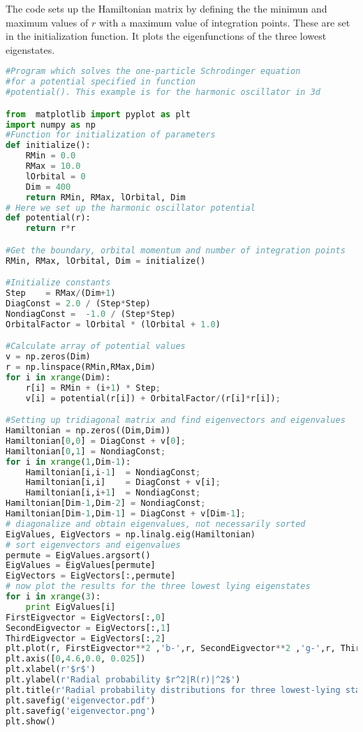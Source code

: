 \documentclass[graybox,sectrefs,envcountresetchap,open=right]{svmonodo}
\begin{document}
\noindent
The code sets up the Hamiltonian matrix by defining the the minimun and maximum values of $r$ with a
maximum value of integration points.  These are set in the initialization function. It plots the 
eigenfunctions of the three lowest eigenstates.
\begin{lstlisting}[language=Python,style=blue1bar]
#Program which solves the one-particle Schrodinger equation 
#for a potential specified in function
#potential(). This example is for the harmonic oscillator in 3d

from  matplotlib import pyplot as plt
import numpy as np
#Function for initialization of parameters
def initialize():
    RMin = 0.0
    RMax = 10.0
    lOrbital = 0
    Dim = 400
    return RMin, RMax, lOrbital, Dim
# Here we set up the harmonic oscillator potential
def potential(r):
    return r*r

#Get the boundary, orbital momentum and number of integration points
RMin, RMax, lOrbital, Dim = initialize()

#Initialize constants
Step    = RMax/(Dim+1)
DiagConst = 2.0 / (Step*Step)
NondiagConst =  -1.0 / (Step*Step)
OrbitalFactor = lOrbital * (lOrbital + 1.0)

#Calculate array of potential values
v = np.zeros(Dim)
r = np.linspace(RMin,RMax,Dim)
for i in xrange(Dim):
    r[i] = RMin + (i+1) * Step;
    v[i] = potential(r[i]) + OrbitalFactor/(r[i]*r[i]);

#Setting up tridiagonal matrix and find eigenvectors and eigenvalues
Hamiltonian = np.zeros((Dim,Dim))
Hamiltonian[0,0] = DiagConst + v[0];
Hamiltonian[0,1] = NondiagConst;
for i in xrange(1,Dim-1):
    Hamiltonian[i,i-1]  = NondiagConst;
    Hamiltonian[i,i]    = DiagConst + v[i];
    Hamiltonian[i,i+1]  = NondiagConst;
Hamiltonian[Dim-1,Dim-2] = NondiagConst;
Hamiltonian[Dim-1,Dim-1] = DiagConst + v[Dim-1];
# diagonalize and obtain eigenvalues, not necessarily sorted
EigValues, EigVectors = np.linalg.eig(Hamiltonian)
# sort eigenvectors and eigenvalues
permute = EigValues.argsort()
EigValues = EigValues[permute]
EigVectors = EigVectors[:,permute]
# now plot the results for the three lowest lying eigenstates
for i in xrange(3):
    print EigValues[i]
FirstEigvector = EigVectors[:,0]
SecondEigvector = EigVectors[:,1]
ThirdEigvector = EigVectors[:,2]
plt.plot(r, FirstEigvector**2 ,'b-',r, SecondEigvector**2 ,'g-',r, ThirdEigvector**2 ,'r-')
plt.axis([0,4.6,0.0, 0.025])
plt.xlabel(r'$r$')
plt.ylabel(r'Radial probability $r^2|R(r)|^2$')
plt.title(r'Radial probability distributions for three lowest-lying states')
plt.savefig('eigenvector.pdf')
plt.savefig('eigenvector.png')
plt.show()

\end{lstlisting}
\end{document}
